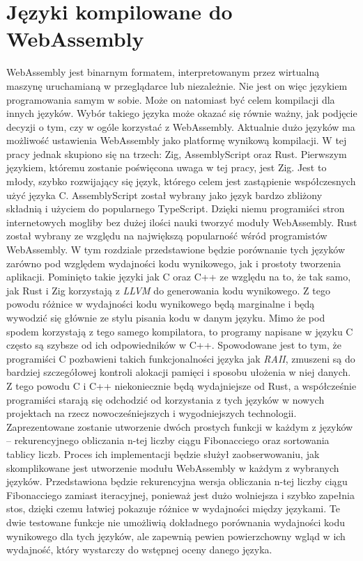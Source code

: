 \documentclass[language=polish,type=master]{aghmodern}
\begin{document}
\chapter{Języki kompilowane do WebAssembly}
WebAssembly jest binarnym formatem, interpretowanym przez wirtualną maszynę uruchamianą w przeglądarce lub niezależnie.
Nie jest on więc językiem programowania samym w sobie.
Może on natomiast być celem kompilacji dla innych języków.
Wybór takiego języka może okazać się równie ważny, jak podjęcie decyzji o tym, czy w ogóle korzystać z WebAssembly.
Aktualnie dużo języków ma możliwość ustawienia WebAssembly jako platformę wynikową kompilacji.
W tej pracy jednak skupiono się na trzech: Zig, AssemblyScript oraz Rust.
Pierwszym językiem, któremu zostanie poświęcona uwaga w tej pracy, jest Zig.
Jest to młody, szybko rozwijający się język, którego celem jest zastąpienie współczesnych użyć języka C.
AssemblyScript został wybrany jako język bardzo zbliżony składnią i użyciem do popularnego TypeScript.
Dzięki niemu programiści stron internetowych mogliby bez dużej ilości nauki tworzyć moduły WebAssembly.
Rust został wybrany ze względu na największą popularność wśród programistów WebAssembly.
W tym rozdziale przedstawione będzie porównanie tych języków zarówno pod względem wydajności kodu wynikowego, jak i prostoty tworzenia aplikacji.
Pominięto takie języki jak C oraz C++ ze względu na to, że tak samo, jak Rust i Zig korzystają z \emph{LLVM}\footnotemark{} do generowania kodu wynikowego.
Z tego powodu różnice w wydajności kodu wynikowego będą marginalne i będą wywodzić się głównie ze stylu pisania kodu w danym języku.
Mimo że pod spodem korzystają z tego samego kompilatora, to programy napisane w języku C często są szybsze od ich odpowiedników w C++.
Spowodowane jest to tym, że programiści C pozbawieni takich funkcjonalności języka jak \emph{RAII}\footnotemark{}, zmuszeni są do bardziej szczegółowej kontroli alokacji pamięci i sposobu ułożenia w niej danych.
Z tego powodu C i C++ niekoniecznie będą wydajniejsze od Rust, a współcześnie programiści starają się odchodzić od korzystania z tych języków w nowych projektach na rzecz nowocześniejszych i wygodniejszych technologii.
Zaprezentowane zostanie utworzenie dwóch prostych funkcji w każdym z języków -- rekurencyjnego obliczania n-tej liczby ciągu Fibonacciego oraz sortowania tablicy liczb.
Proces ich implementacji będzie służył zaobserwowaniu, jak skomplikowane jest utworzenie modułu WebAssembly w każdym z wybranych języków.
Przedstawiona będzie rekurencyjna wersja obliczania n-tej liczby ciągu Fibonacciego zamiast iteracyjnej, ponieważ jest dużo wolniejsza i szybko zapełnia stos, dzięki czemu łatwiej pokazuje różnice w wydajności między językami.
Te dwie testowane funkcje nie umożliwią dokładnego porównania wydajności kodu wynikowego dla tych języków, ale zapewnią pewien powierzchowny wgląd w ich wydajność, który wystarczy do wstępnej oceny danego języka.
\end{document}
